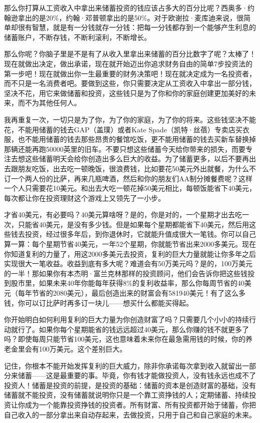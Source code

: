 那么你打算从工资收入中拿出来储蓄投资的钱应该占多大的百分比呢？西奥多·约翰逊拿出的是20\%，约翰·邓普顿拿出的是50\%。对于欧谢拉·麦库迪来说，很简单却很有智慧，就是有一分钱就存一分钱：把每一分钱都存到一个能够产生利息的储蓄账户，不断存钱，不断利滚利，不断增长。

那么你呢？你脑子里是不是有了从收入里拿出来储蓄的百分比数字了呢？太棒了！现在就做出决定，做出承诺，现在就开始迈出你追求财务自由的简单7步投资法的第一步吧！现在就做出你一生最重要的财务决策吧！现在就决定成为一名投资者，而不只是一名消费者吧。要做到这些，你只需要决定从工资收入中拿出一部分钱，坚决不花，用它来做储蓄和投资，这些钱只是为了你和你的家庭创建更加美好的未来，而不为其他任何人。

我再重复一次，一切只是为了你，为了你的家庭，为了你的将来。这些钱坚决不能花，不能用储蓄的钱去GAP（盖璞）或者Kate Spade（凯特·丝蓓）专卖店买衣服，也不能用储蓄的钱去那些昂贵的餐馆吃饭，更不能用储蓄的钱去买新车替换掉那辆还能再跑50000英里的旧车。不要只想这些储蓄今天给你带来的损失，而要专注去想这些储蓄明天会给你创造出多么巨大的收益。为了储蓄更多，以后不要再出去跟朋友吃饭，出去吃一顿晚饭，很浪费钱，比如要花50美元外出就餐，为什么不订一个两人份的比萨，再来几瓶啤酒，然后和你的朋友们AA制分摊餐费呢？这样一个人只需要花10美元。和出去大吃一顿花掉50美元相比，每顿饭能省下40美元，每次都让你在投资理财这个游戏上又领先了一小步。

才省40美元，有必要吗？40美元算啥呀？是的，你是对的，一个星期才出去吃一次，只能省40美元，是没有多少钱。但是如果每个星期都能省下40美元，然后用这些钱去投资，经过很多年后，到你退休时，它就能升值成很大一笔钱。你可以自己算一算：每个星期节省40美元，一年52个星期，你就能节省出来2000多美元。现在你知道复利的力量了，用这2000多美元去投资，复利的巨大力量就能让你多年之后实现很大一笔收益。收益到底有多大呢？难道会有50万美元吗？是的，100万美元的一半！那如果你有本杰明·富兰克林那样的投资顾问，他们会告诉你把这些钱投到股市里，如果未来40年你能每年获得8\%的复利收益率，那么你每周节省的40美元（每年节省的2080美元），最后创造出来的财富会有581940美元！有了这么多钱，你可以订比萨时再多订一块儿——想买什么都能买得起。

你开始明白如何利用复利的巨大力量为你创造财富了吗？只需要几个小小的持续行动就行了。如果你每个星期能省的钱远远超过40美元，那么你赚的钱不就更多了吗？即使每周只能节省100美元，这也意味着未来你在最急需用钱的时候，你的养老金里会有100万美元。这个差别巨大。

记住，你根本不能开始发挥复利的巨大威力，除非你承诺每次拿到收入就留出一部分来储蓄——这是最重要的事。毕竟，你有钱才能做投资人，没有钱永远也成不了投资人！储蓄是投资的前提，是投资的基础：储蓄的资本是创造财富的基础，没有储蓄就不能投资，没有储蓄就说明你只是一个靠工资挣钱的人；定期储蓄、持续投资让你成为一个能靠投资挣钱的投资者。所有财富、所有投资都开始于储蓄，你把自己收入的一部分拿出来自动存起来，去做投资，只用于自己和自己家庭的未来。

